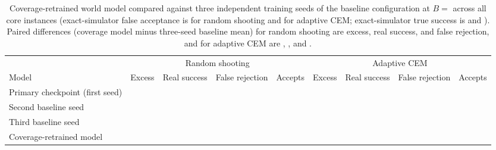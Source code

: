 \begin{table}[tbp]
\caption{Coverage-retrained \SizeM{} world model compared against three independent training seeds of the baseline \SizeM{} configuration at $B ={}$ across all \CovSdN{} core instances (exact-simulator false acceptance is \CovSdRandPerfHack{} for random shooting and \CovSdAdPerfHack{} for adaptive CEM; exact-simulator true success is \CovSdRandPerfOrAcc{} and \CovSdAdPerfOrAcc{}). Paired differences (coverage model minus three-seed baseline mean) for random shooting are \CovSdRandExcessDiff{} \ci{\CovSdRandExcessDiffCI} excess, \CovSdRandOrAccDiff{} \ci{\CovSdRandOrAccDiffCI} real success, and \CovSdRandFalseRejDiff{} \ci{\CovSdRandFalseRejDiffCI} false rejection, and for adaptive CEM are \CovSdAdExcessDiff{} \ci{\CovSdAdExcessDiffCI}, \CovSdAdOrAccDiff{} \ci{\CovSdAdOrAccDiffCI}, and \CovSdAdFalseRejDiff{} \ci{\CovSdAdFalseRejDiffCI}.}
\label{tab:covseeds}
\centering\scriptsize\setlength{\tabcolsep}{4pt}
\begin{tabular}{@{}lrrrrrrrr@{}}
\toprule
& \multicolumn{4}{c}{Random shooting} & \multicolumn{4}{c}{Adaptive CEM} \\
\cmidrule(lr){2-5}\cmidrule(l){6-9}
Model & Excess & Real success & False rejection & Accepts & Excess & Real success & False rejection & Accepts \\
\midrule
Primary checkpoint (first seed) & \CovSdRandExcessSeedZero{} & \CovSdRandOrAccSeedZero{} & \CovSdRandFalseRejSeedZero{} & \CovSdRandJudgeAccSeedZero{} &
\CovSdAdExcessSeedZero{} & \CovSdAdOrAccSeedZero{} & \CovSdAdFalseRejSeedZero{} & \CovSdAdJudgeAccSeedZero{} \\
Second baseline seed & \CovSdRandExcessSeedOne{} & \CovSdRandOrAccSeedOne{} & \CovSdRandFalseRejSeedOne{} & \CovSdRandJudgeAccSeedOne{} &
\CovSdAdExcessSeedOne{} & \CovSdAdOrAccSeedOne{} & \CovSdAdFalseRejSeedOne{} & \CovSdAdJudgeAccSeedOne{} \\
Third baseline seed & \CovSdRandExcessSeedTwo{} & \CovSdRandOrAccSeedTwo{} & \CovSdRandFalseRejSeedTwo{} & \CovSdRandJudgeAccSeedTwo{} &
\CovSdAdExcessSeedTwo{} & \CovSdAdOrAccSeedTwo{} & \CovSdAdFalseRejSeedTwo{} & \CovSdAdJudgeAccSeedTwo{} \\
\midrule
Coverage-retrained model & \CovSdRandExcessCov{} & \CovSdRandOrAccCov{} & \CovSdRandFalseRejCov{} & \CovSdRandJudgeAccCov{} &
\CovSdAdExcessCov{} & \CovSdAdOrAccCov{} & \CovSdAdFalseRejCov{} & \CovSdAdJudgeAccCov{} \\
\bottomrule
\end{tabular}
\end{table}

